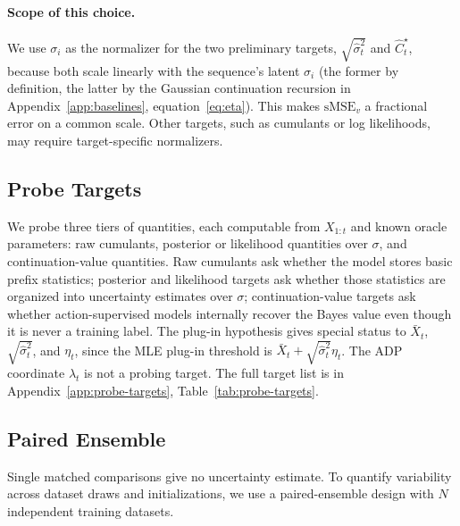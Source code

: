 \documentclass[11pt]{article}
\begin{document}
\paragraph{Scope of this choice.} We use $\sigma_i$ as the normalizer for the two preliminary targets, $\sqrt{\hat\sigma_t^2}$ and $\widehat C^\star_t$, because both scale linearly with the sequence's latent $\sigma_i$ (the former by definition, the latter by the Gaussian continuation recursion in Appendix~\ref{app:baselines}, equation~\eqref{eq:eta}). This makes $\mathrm{sMSE}_v$ a fractional error on a common scale. Other targets, such as cumulants or log likelihoods, may require target-specific normalizers.


\subsection{Probe Targets}
\label{sec:probe-targets}

We probe three tiers of quantities, each computable from $X_{1:t}$ and known oracle parameters: raw cumulants, posterior or likelihood quantities over $\sigma$, and continuation-value quantities. Raw cumulants ask whether the model stores basic prefix statistics; posterior and likelihood targets ask whether those statistics are organized into uncertainty estimates over $\sigma$; continuation-value targets ask whether action-supervised models internally recover the Bayes value even though it is never a training label. The plug-in hypothesis gives special status to \(\bar X_t\), \(\sqrt{\hat\sigma_t^2}\), and \(\eta_t\), since the MLE plug-in threshold is \(\bar X_t+\sqrt{\hat\sigma_t^2}\eta_t\). The ADP coordinate \(\lambda_t\) is not a probing target. The full target list is in Appendix~\ref{app:probe-targets}, Table~\ref{tab:probe-targets}.

\subsection{Paired Ensemble}
\label{sec:probe-ensemble}

Single matched comparisons give no uncertainty estimate. To quantify variability across dataset draws and initializations, we use a paired-ensemble design with $N$ independent training datasets.
\end{document}
